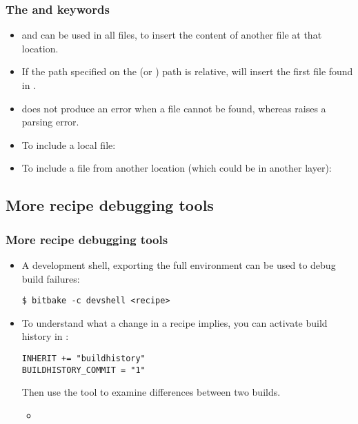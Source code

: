 \begin{frame}
  \frametitle{The  and  keywords}
  \begin{itemize}
    \item {} and  can be used in all files,
      to insert the content of another file at that location.
    \item If the path specified on the  (or
      ) path is relative,  will insert the first
      file found in .
    \item {} does not produce an error when a file cannot
      be found, whereas  raises a parsing error.
    \item To include a local file: 
    \item To include a file from another location (which could be
      in another layer): 
  \end{itemize}
\end{frame}

\subsection{More recipe debugging tools}

\begin{frame}[fragile]
  \frametitle{More recipe debugging tools}
  \begin{itemize}
    \item A development shell, exporting the full environment can be
      used to debug build failures:
      \begin{block}{}
        \begin{verbatim}
$ bitbake -c devshell <recipe>
        \end{verbatim}
      \end{block}
    \item To understand what a change in a recipe implies, you can
      activate build history in :
      \begin{block}{}
        \begin{verbatim}
INHERIT += "buildhistory"
BUILDHISTORY_COMMIT = "1"
        \end{verbatim}
      \end{block}
      Then use the  tool to examine
      differences between two builds.
      \begin{itemize}
        \item {}
      \end{itemize}
  \end{itemize}
\end{frame}

